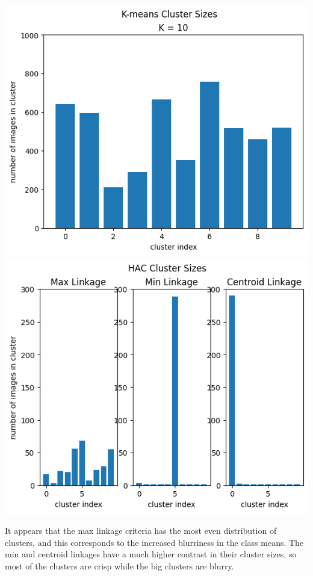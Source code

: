 \documentclass[expanded]{lkx_pset}
\begin{document}
\begin{parts}
	\begin{center}
		\includegraphics[scale = 0.7]{figures/kmeans-cluster_sizes.png}
		\includegraphics[scale = 0.7]{figures/HAC-cluster_sizes.png}
	\end{center}

	It appears that the max linkage criteria has the most even distribution of clusters, and this corresponds to the increased blurriness in the class means. The min and centroid linkages have a much higher contrast in their cluster sizes, so most of the clusters are crisp while the big clusters are blurry.


\end{parts}
\end{document}
